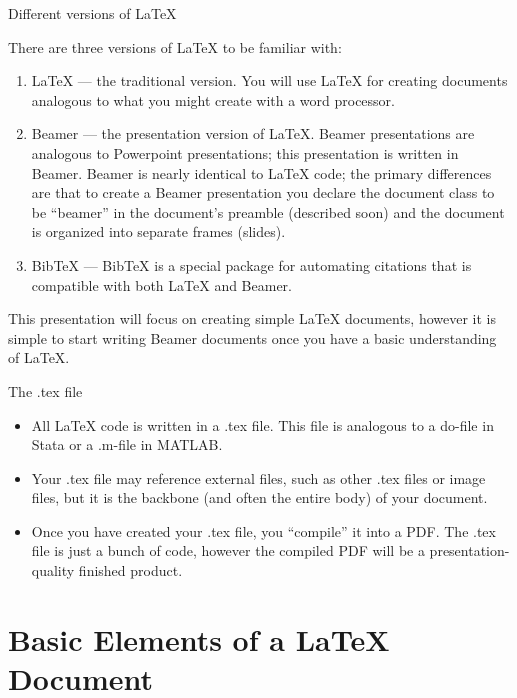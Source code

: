 \documentclass[fleqn, 10pt]{beamer}
\begin{document}
\begin{frame}{Different versions of \LaTeX{}}

    There are three versions of \LaTeX{} to be familiar with: \pause
    \begin{enumerate}
        \item \LaTeX{} --- the traditional version. You will use \LaTeX{} for creating documents analogous to what you might create with a word processor. \pause
        \item Beamer --- the presentation version of \LaTeX{}. Beamer presentations are analogous to Powerpoint presentations; this presentation is written in Beamer. Beamer is nearly identical to \LaTeX{} code; the primary differences are that to create a Beamer presentation you declare the document class to be ``beamer'' in the document's preamble (described soon) and the document is organized into separate frames (slides). \pause
        \item BibTeX --- BibTeX is a special package for automating citations that is compatible with both \LaTeX{} and Beamer. \pause
    \end{enumerate}
    This presentation will focus on creating simple \LaTeX{} documents, however it is simple to start writing Beamer documents once you have a basic understanding of \LaTeX{}.
\end{frame}

\begin{frame}{The .tex file}
    \begin{itemize}
        \item All \LaTeX{} code is written in a .tex file. This file is analogous to a do-file in Stata or a .m-file in MATLAB.
        \item Your .tex file may reference external files, such as other .tex files or image files, but it is the backbone (and often the entire body) of your document.
        \item Once you have created your .tex file, you ``compile'' it into a PDF. The .tex file is just a bunch of code, however the compiled PDF will be a presentation-quality finished product.
    \end{itemize}
\end{frame}

\section{Basic Elements of a \LaTeX{} Document}
\end{document}

